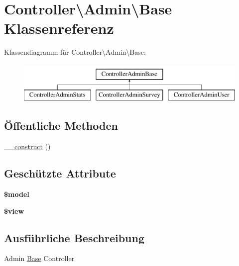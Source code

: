 \hypertarget{class_controller_1_1_admin_1_1_base}{\section{Controller\textbackslash{}Admin\textbackslash{}Base Klassenreferenz}
\label{class_controller_1_1_admin_1_1_base}
}
Klassendiagramm für Controller\textbackslash{}Admin\textbackslash{}Base\-:\begin{figure}[H]
\begin{center}
\leavevmode
\includegraphics[height=2.000000cm]{class_controller_1_1_admin_1_1_base}
\end{center}
\end{figure}
\subsection*{Öffentliche Methoden}
\begin{DoxyCompactItemize}
\item 
\hyperlink{class_controller_1_1_admin_1_1_base_a7e433734833c21c222186860f4cd8ce5}{\-\_\-\-\_\-construct} ()
\end{DoxyCompactItemize}
\subsection*{Geschützte Attribute}
\begin{DoxyCompactItemize}
\item 
\hypertarget{class_controller_1_1_admin_1_1_base_a81e643de0230305e97280882958503bc}{{\bfseries \$model}}\label{class_controller_1_1_admin_1_1_base_a81e643de0230305e97280882958503bc}

\item 
\hypertarget{class_controller_1_1_admin_1_1_base_a4ec09c707c52e90309310f35575706d3}{{\bfseries \$view}}\label{class_controller_1_1_admin_1_1_base_a4ec09c707c52e90309310f35575706d3}

\end{DoxyCompactItemize}


\subsection{Ausführliche Beschreibung}
Admin \hyperlink{class_controller_1_1_admin_1_1_base}{Base} Controller 

